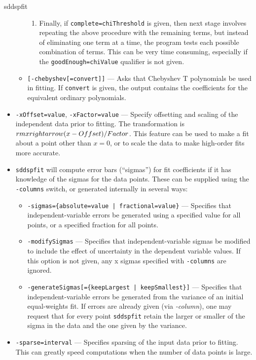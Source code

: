 \begin{sddsprog}{sddspfit}
\begin{itemize}
\begin{itemize}
\begin{enumerate}
              \item Finally, if \verb|complete=chiThreshold| is given, then next stage involves repeating the above procedure with the remaining terms, but instead of eliminating one term at a time, the program tests each possible combination of terms. This can be very time consuming, especially if the \verb|goodEnough=chiValue| qualifier is not given.
            \end{enumerate}
          \item \verb|[-chebyshev[=convert]]| --- Asks that Chebyshev T polynomials be used in fitting. If \verb|convert| is given, the output contains the coefficients for the equivalent ordinary polynomials.
        \end{itemize}
      \item \verb|-xOffset=value|, \verb|-xFactor=value| --- Specify offsetting and scaling of the independent data prior to fitting. The transformation is ${\\rm x \\rightarrow (x - Offset)/Factor}$. This feature can be used to make a fit about a point other than $x=0$, or to scale the data to make high-order fits more accurate.
      \item \verb|sddspfit| will compute error bars (``sigmas'') for fit coefficients if it has knowledge of the sigmas for the data points. These can be supplied using the \verb|-columns| switch, or generated internally in several ways:
        \begin{itemize}
          \item \verb!-sigmas={absolute=value | fractional=value}! --- Specifies that independent-variable errors be generated using a specified value for all points, or a specified fraction for all points.
          \item \verb|-modifySigmas| --- Specifies that independent-variable sigmas be modified to include the effect of uncertainty in the dependent variable values. If this option is not given, any x sigmas specified with \verb|-columns| are ignored.
          \item \verb!-generateSigmas[={keepLargest | keepSmallest}]! --- Specifies that independent-variable errors be generated from the variance of an initial equal-weights fit. If errors are already given (via \emph{-column}), one may request that for every point \verb|sddspfit| retain the larger or smaller of the sigma in the data and the one given by the variance.
        \end{itemize}
      \item \verb|-sparse=interval| --- Specifies sparsing of the input data prior to fitting. This can greatly speed computations when the number of data points is large.

\end{itemize}
\end{sddsprog}
